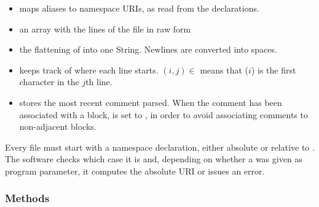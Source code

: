 \begin{itemize}

\item {} maps aliases to namespace URIs, as read from the  declarations.

\item {} an array with the lines of the file in raw form

\item {} the flattening of  into one String. Newlines are converted into spaces.

\item {} keeps track of where each line starts. $(i, j) \in $ means that ($i$) is the first character in the  $j$th line.

\item {} stores the most recent  comment parsed. When the comment has been associated with a block,  is set to , in order to avoid associating comments to non-adjacent blocks.

\end{itemize}

Every file must start with a namespace declaration, either absolute or relative to . The software checks which case it is and, depending on whether a  was given as program parameter, it computes the absolute URI or issues an error.

\subsubsection{Methods}

